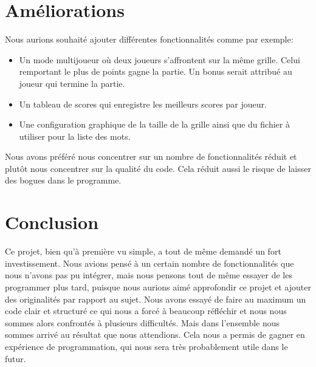 \documentclass{article}
\begin{document}
\section{Améliorations}

Nous aurions souhaité ajouter différentes fonctionnalités comme par exemple:
\begin{itemize}
  \item Un mode multijoueur où deux joueurs s'affrontent sur la même grille. Celui remportant le plus de points gagne la partie. Un bonus serait attribué au joueur qui termine la partie.
  \item Un tableau de scores qui enregistre les meilleurs scores par joueur.
  \item Une configuration graphique de la taille de la grille ainsi que du fichier à utiliser pour la liste des mots.
\end{itemize}
Nous avons préféré nous concentrer sur un nombre de fonctionnalités réduit et plutôt nous concentrer sur la qualité du code. Cela réduit aussi le risque de laisser des bogues dans le programme.

\section{Conclusion}
Ce projet, bien qu'à première vu simple, a tout de même demandé un fort investissement. Nous avions pensé à un certain nombre de fonctionnalités que nous n'avons pas pu intégrer, mais nous pensons tout de même essayer de les programmer plus tard, puisque nous aurions aimé approfondir ce projet et ajouter des originalités par rapport au sujet. Nous avons essayé de faire au maximum un code clair et structuré ce qui nous a forcé à beaucoup réfléchir et nous nous sommes alors confrontés à plusieurs difficultés. Mais dans l'ensemble nous sommes arrivé au résultat que nous attendions. Cela nous a permis de gagner en expérience de programmation, qui nous sera très probablement utile dans le futur.
\end{document}
